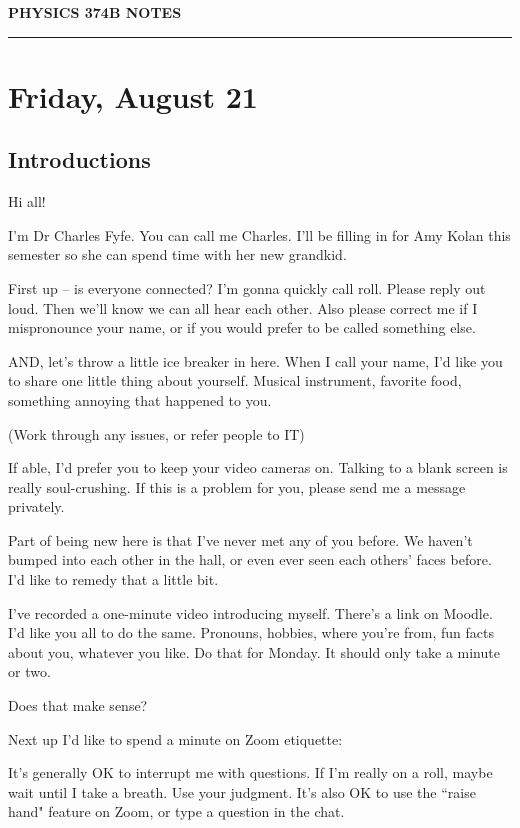 \documentclass[10pt]{article}
\begin{document}
\setlength{\parindent}{0in}
\setlength{\parskip}{1em}

\begin{center}
{\bf PHYSICS 374B NOTES}
\end{center}
\hrule
\vskip0.15in

\section*{Friday, August 21}

\subsection*{Introductions}

Hi all!

I'm Dr Charles Fyfe. You can call me Charles. I'll be filling in for Amy Kolan this semester so she can spend time with her new grandkid. 

First up -- is everyone connected? I'm gonna quickly call roll. Please reply out loud. Then we'll know we can all hear each other. Also please correct me if I mispronounce your name, or if you would prefer to be called something else.

AND, let's throw a little ice breaker in here. When I call your name, I'd like you to share one little thing about yourself. Musical instrument, favorite food, something annoying that happened to you. 

(Work through any issues, or refer people to IT)

If able, I'd prefer you to keep your video cameras on. Talking to a blank screen is really soul-crushing. If this is a problem for you, please send me a message privately.

Part of being new here is that I've never met any of you before. We haven't bumped into each other in the hall, or even ever seen each others' faces before. I'd like to remedy that a little bit. 

I've recorded a one-minute video introducing myself. There's a link on Moodle. I'd like you all to do the same. Pronouns, hobbies, where you're from, fun facts about you, whatever you like. Do that for Monday. It should only take a minute or two. 

Does that make sense?

Next up I'd like to spend a minute on Zoom etiquette:

It's generally OK to interrupt me with questions. If I'm really on a roll, maybe wait until I take a breath. Use your judgment. It's also OK to use the ``raise hand" feature on Zoom, or type a question in the chat. 
\end{document}
